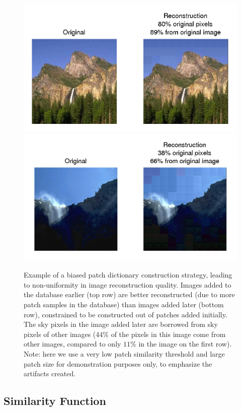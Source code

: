  \begin{figure}
\includegraphics[width=1\linewidth]{Figures/009.png}
\includegraphics[width=1\linewidth]{Figures/014.png}
\caption{Example of a biased patch dictionary construction strategy, leading to non-uniformity in image reconstruction quality. Images added to the database earlier (top row) are better reconstructed (due to more patch samples in the database) than images added later (bottom row), constrained to be constructed out of patches added initially. The sky pixels in the image added later are borrowed from sky pixels of other images ($44\%$ of the pixels in this image come from other images, compared to only $11\%$ in the image on the first row). Note: here we use a very low patch similarity threshold and large patch size for demonstration purposes only, to emphasize the artifacts created.}
\label{fig:sampStrategy}
\end{figure}


\subsection{Similarity Function}
\label{sec:simthresh}

